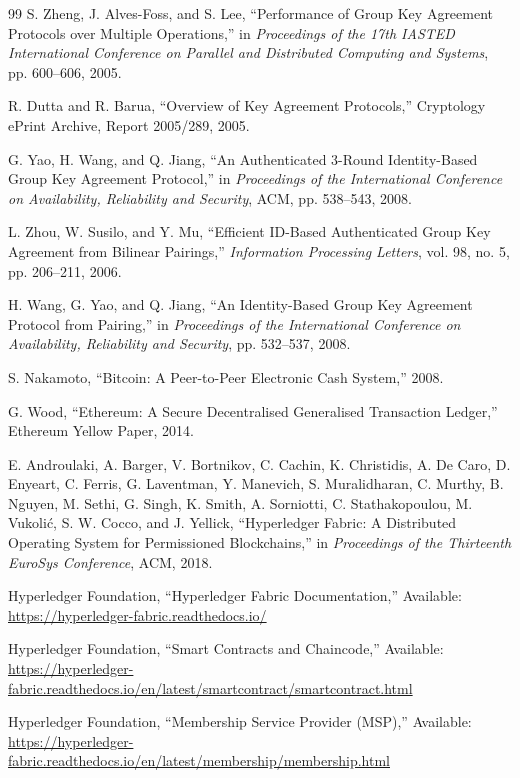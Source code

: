 \documentclass[12pt,a4paper]{report}
\begin{document}
\begin{thebibliography}{99}
S. Zheng, J. Alves-Foss, and S. Lee,
``Performance of Group Key Agreement Protocols over Multiple Operations,''
in \textit{Proceedings of the 17th IASTED International Conference on Parallel and Distributed Computing and Systems},
pp. 600--606, 2005.

R. Dutta and R. Barua,
``Overview of Key Agreement Protocols,''
Cryptology ePrint Archive, Report 2005/289, 2005.

G. Yao, H. Wang, and Q. Jiang,
``An Authenticated 3-Round Identity-Based Group Key Agreement Protocol,''
in \textit{Proceedings of the International Conference on Availability, Reliability and Security},
ACM, pp. 538--543, 2008.

L. Zhou, W. Susilo, and Y. Mu,
``Efficient ID-Based Authenticated Group Key Agreement from Bilinear Pairings,''
\textit{Information Processing Letters},
vol. 98, no. 5, pp. 206--211, 2006.

H. Wang, G. Yao, and Q. Jiang,
``An Identity-Based Group Key Agreement Protocol from Pairing,''
in \textit{Proceedings of the International Conference on Availability, Reliability and Security},
pp. 532--537, 2008.

S. Nakamoto,
``Bitcoin: A Peer-to-Peer Electronic Cash System,''
2008.

G. Wood,
``Ethereum: A Secure Decentralised Generalised Transaction Ledger,''
Ethereum Yellow Paper, 2014.

E. Androulaki, A. Barger, V. Bortnikov, C. Cachin, K. Christidis,
A. De Caro, D. Enyeart, C. Ferris, G. Laventman, Y. Manevich,
S. Muralidharan, C. Murthy, B. Nguyen, M. Sethi, G. Singh,
K. Smith, A. Sorniotti, C. Stathakopoulou, M. Vukolić,
S. W. Cocco, and J. Yellick,
``Hyperledger Fabric: A Distributed Operating System for Permissioned Blockchains,''
in \textit{Proceedings of the Thirteenth EuroSys Conference},
ACM, 2018.

Hyperledger Foundation,
``Hyperledger Fabric Documentation,''
Available: \url{https://hyperledger-fabric.readthedocs.io/}

Hyperledger Foundation,
``Smart Contracts and Chaincode,''
Available: \url{https://hyperledger-fabric.readthedocs.io/en/latest/smartcontract/smartcontract.html}

Hyperledger Foundation,
``Membership Service Provider (MSP),''
Available: \url{https://hyperledger-fabric.readthedocs.io/en/latest/membership/membership.html}


\end{thebibliography}
\end{document}
